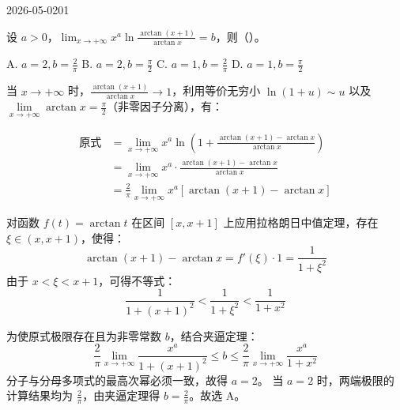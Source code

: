 \begin{mistake}{2026-05-02}{01}

\begin{problemcontent}
设 \(a > 0\)，\(\displaystyle \lim_{x \to +\infty} x^a \ln \frac{\arctan(x+1)}{\arctan x} = b\)，则（\quad）。

A. \(a = 2,b = \frac{2}{\pi}\) \qquad
B. \(a = 2,b = \frac{\pi}{2}\) \qquad
C. \(a = 1,b = \frac{2}{\pi}\) \qquad
D. \(a = 1,b = \frac{\pi}{2}\)
\end{problemcontent}

\begin{solutioncontent}
当 \(x \to +\infty\) 时，\(\frac{\arctan(x+1)}{\arctan x} \to 1\)，利用等价无穷小 \(\ln(1+u) \sim u\) 以及 \(\lim\limits_{x \to +\infty} \arctan x = \frac{\pi}{2}\)（非零因子分离），有：

\[
\begin{aligned}
\text{原式} &= \lim_{x \to +\infty} x^a \ln \left( 1 + \frac{\arctan(x+1) - \arctan x}{\arctan x} \right) \\
&= \lim_{x \to +\infty} x^a \cdot \frac{\arctan(x+1) - \arctan x}{\arctan x} \\
&= \frac{2}{\pi} \lim_{x \to +\infty} x^a [\arctan(x+1) - \arctan x]
\end{aligned}
\]

对函数 \(f(t) = \arctan t\) 在区间 \([x, x+1]\) 上应用拉格朗日中值定理，存在 \(\xi \in (x, x+1)\)，使得：
\[ \arctan(x+1) - \arctan x = f'(\xi)\cdot 1 = \frac{1}{1+\xi^2} \]
由于 \(x < \xi < x+1\)，可得不等式：
\[ \frac{1}{1+(x+1)^2} < \frac{1}{1+\xi^2} < \frac{1}{1+x^2} \]

为使原式极限存在且为非零常数 \(b\)，结合夹逼定理：
\[ \frac{2}{\pi} \lim_{x \to +\infty} \frac{x^a}{1+(x+1)^2} \le b \le \frac{2}{\pi} \lim_{x \to +\infty} \frac{x^a}{1+x^2} \]
分子与分母多项式的最高次幂必须一致，故得 \(a = 2\)。
当 \(a=2\) 时，两端极限的计算结果均为 \(\frac{2}{\pi}\)，由夹逼定理得 \(b = \frac{2}{\pi}\)。故选 A。
\end{solutioncontent}


\end{mistake}
